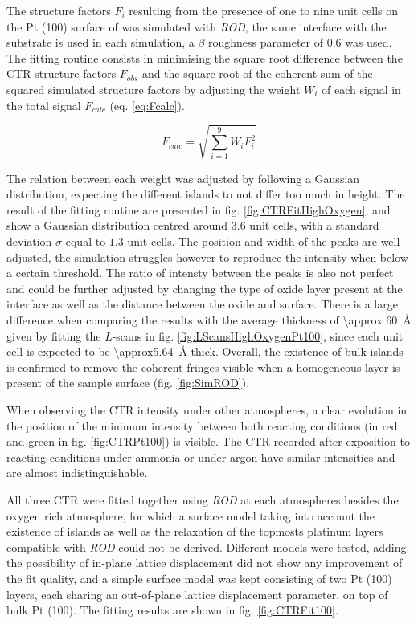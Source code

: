 The structure factors $F_i$ resulting from the presence of one to nine unit cells on the Pt (100) surface of  was simulated with \textit{ROD}, the same interface with the substrate is used in each simulation, a $\beta$ roughness parameter of 0.6 was used.
The fitting routine consists in minimising the square root difference between the CTR structure factors $F_{obs}$ and the square root of the coherent sum of the squared simulated structure factors by adjusting the weight $W_i$ of each signal in the total signal $F_{calc}$ (eq. \ref{eq:Fcalc}).

\begin{equation}
    F_{calc} = \sqrt{\sum_{i=1}^{9} W_i F_i^2}
    \label{eq:Fcalc}
\end{equation}

The relation between each weight was adjusted by following a Gaussian distribution, expecting the different islands to not differ too much in height.
The result of the fitting routine are presented in fig. \ref{fig:CTRFitHighOxygen}, and show a Gaussian distribution centred around $3.6$ unit cells, with a standard deviation $\sigma$ equal to $1.3$ unit cells.
The position and width of the  peaks are well adjusted, the simulation struggles however to reproduce the intensity when below a certain threshold.
The ratio of intensty between the  peaks is also not perfect and could be further adjusted by changing the type of oxide layer present at the interface as well as the distance between the oxide and surface.
There is a large difference when comparing the results with the average thickness of \qty{\approx 60}{\angstrom} given by fitting the $L$-scans in fig. \ref{fig:LScansHighOxygenPt100}, since each unit cell is expected to be \qty{\approx5.64}{\angstrom} thick.
Overall, the existence of bulk  islands is confirmed to remove the coherent fringes visible when a homogeneous layer is present of the sample surface (fig. \ref{fig:SimROD}).

When observing the CTR intensity under other atmospheres, a clear evolution in the position of the minimum intensity between both reacting conditions (in red and green in fig. \ref{fig:CTRPt100}) is visible.
The CTR recorded after exposition to reacting conditions under ammonia or under argon have similar intensities and are almost indistinguishable.

All three CTR were fitted together using \textit{ROD} at each atmospheres besides the oxygen rich atmosphere, for which a surface model taking into account the existence of  islands as well as the relaxation of the topmosts platinum layers compatible with \textit{ROD} could not be derived.
Different models were tested, adding the possibility of in-plane lattice displacement did not show any improvement of the fit quality, and a simple surface model was kept consisting of two Pt (100) layers, each sharing an out-of-plane lattice displacement parameter, on top of bulk Pt (100).
The fitting results are shown in fig. \ref{fig:CTRFit100}.

